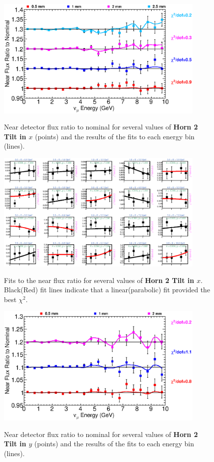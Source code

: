 \begin{figure}[ht]
  \begin{center}
    {\includegraphics[width=4.0in]{figures/Horn2XTilt_near_summary.eps}}
  \end{center}
\caption{ Near detector flux ratio to nominal for several values of {\bf Horn 2 Tilt in $x$} (points) and the results of the fits to each energy bin (lines).}
\end{figure}

\begin{figure}[hb]
  \begin{center}
    {\includegraphics[width=4.0in]{figures/Horn2XTilt_near_fits.eps}}
  \end{center}
\caption{ Fits to the near flux ratio for several values of {\bf Horn 2 Tilt in $x$}. Black(Red) fit lines indicate that a linear(parabolic) fit provided the best $\chi^2$. }
\end{figure}

\begin{figure}[ht]
  \begin{center}
    {\includegraphics[width=4.0in]{figures/Horn2YTilt_near_summary.eps}}
  \end{center}
\caption{ Near detector flux ratio to nominal for several values of {\bf Horn 2 Tilt in $y$} (points) and the results of the fits to each energy bin (lines).}
\end{figure}

